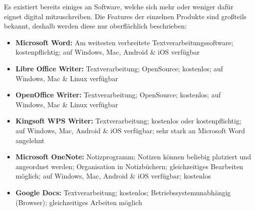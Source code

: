 
Es existiert bereits einiges an Software, welche sich mehr oder weniger dafür eignet digital mitzuschreiben. Die Features der einzelnen Produkte sind großteils bekannt, deshalb werden diese nur oberflächlich beschrieben:

\begin{itemize}
\item \textbf{Microsoft Word:} Am weitesten verbreitete Textverarbeitungssoftware; kostenpflichtig; auf Windows, Mac, Android \& iOS verfügbar
\item \textbf{Libre Office Writer:} Textverarbeitung; OpenSource; kostenlos; auf Windows, Mac \& Linux verfügbar
\item \textbf{OpenOffice Writer:} Textverarbeitung; OpenSource; kostenlos; auf Windows, Mac \& Linux verfügbar
\item \textbf{Kingsoft WPS Writer:} Textverarbeitung; kostenlos oder kostenpflichtig; auf Windows, Mac, Android \& iOS verfügbar; sehr stark an Microsoft Word angelehnt
\item \textbf{Microsoft OneNote:} Notizprogramm; Notizen können beliebig platziert und angeordnet werden; Organisation in Notizbüchern; gleichzeitiges Bearbeiten möglich; auf Windows, Mac, Android \& iOS verfügbar; kostenlos
\item \textbf{Google Docs:} Textverarbeitung; kostenlos; Betriebssystemunabhängig (Browser); gleichzeitiges Arbeiten möglich
\end{itemize}